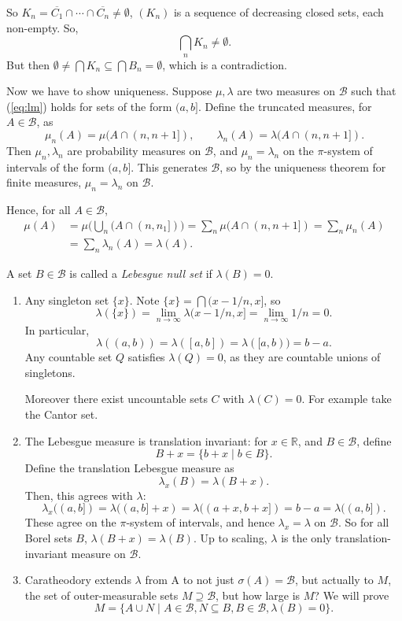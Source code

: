 \documentclass[12pt]{article}
\begin{document}
\begin{proofbox}
	So $K_n = \overline{C_1} \cap \cdots \cap \overline{C_n} \neq \emptyset$, $(K_n)$ is a sequence of decreasing closed sets, each non-empty. So,
	\[
	\bigcap_n K_n \neq \emptyset.
	\]
	But then $\emptyset \neq \bigcap K_n \subseteq \bigcap B_n = \emptyset$, which is a contradiction.

	Now we have to show uniqueness. Suppose $\mu, \lambda$ are two measures on $\mathcal{B}$ such that (\ref{eq:lm}) holds for sets of the form $(a, b]$. Define the truncated measures, for $A \in \mathcal{B}$, as
	\[
		\mu_n(A) = \mu(A \cap (n, n+1]), \qquad \lambda_n(A) = \lambda(A \cap (n,n+1]).
	\]
	Then $\mu_n, \lambda_n$ are probability measures on $\mathcal{B}$, and $\mu_n = \lambda_n$ on the $\pi$-system of intervals of the form $(a, b]$. This generates $\mathcal{B}$, so by the uniqueness theorem for finite measures, $\mu_n = \lambda_n$ on $\mathcal{B}$.

	Hence, for all $A \in \mathcal{B}$,
	\begin{align*}
		\mu(A) &= \mu\Biggl( \bigcup_n (A \cap (n, n_1]) \Biggr) = \sum_n \mu(A \cap (n,n+1]) = \sum_n \mu_n(A) \\
		       &= \sum_n \lambda_n(A) = \lambda(A).
	\end{align*}
\end{proofbox}

\begin{remark}
A set $B \in \mathcal{B}$ is called a \emph{Lebesgue null set} if $\lambda(B) = 0$.
\begin{enumerate}
	\item Any singleton set $\{x\}$. Note $\{x\} = \bigcap (x - 1/n, x]$, so
		\[
			\lambda(\{x\}) = \lim_{n \to \infty} \lambda ( x- 1/n, x ] = \lim_{n\to\infty} 1/n=0.
		\]
		In particular,
		\[
			\lambda((a,b)) = \lambda([a,b])=\lambda([a,b)) = b - a.
		\] 
		Any countable set $Q$ satisfies $\lambda(Q) = 0$, as they are countable unions of singletons.

		Moreover there exist uncountable sets $C$ with $\lambda(C) = 0$. For example take the Cantor set.
	\item The Lebesgue measure is translation invariant: for $x \in \mathbb{R}$, and $B \in \mathcal{B}$, define
		\[
			B + x = \{b + x \mid b \in B\}.
		\]
		Define the translation Lebesgue measure as
		\[
		\lambda_x(B) = \lambda(B+x).
		\]
		Then, this agrees with $\lambda$:
		\[
			\lambda_x((a,b]) = \lambda((a,b]+x)=\lambda((a+x,b+x]) = b - a = \lambda((a,b]).
		\]
		These agree on the $\pi$-system of intervals, and hence $\lambda_x = \lambda$ on $\mathcal{B}$. So for all Borel sets $B$, $\lambda(B+x) = \lambda(B)$. Up to scaling, $\lambda$ is the only translation-invariant measure on $\mathcal{B}$.
	\item Caratheodory extends $\lambda$ from A to not just $\sigma(A) = \mathcal{B}$, but actually to $M$, the set of outer-measurable sets $M \supseteq \mathcal{B}$, but how large is $M$? We will prove
		\[
			M = \{A \cup N \mid A \in \mathcal{B}, N \subseteq B, B \in \mathcal{B}, \lambda(B) = 0\}.
		\]
\end{enumerate}
\end{remark}
\end{document}
